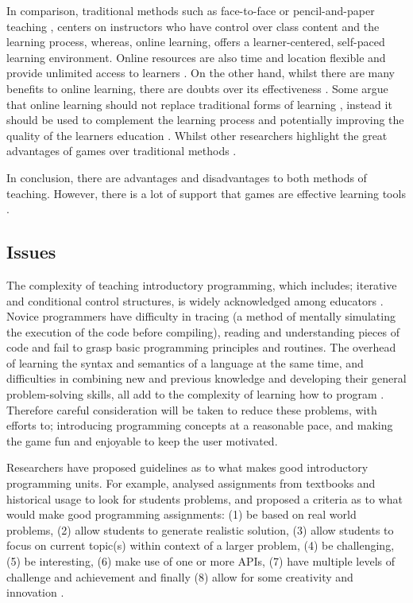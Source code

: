 \documentclass[a4paper,11.5pt]{report}
\numberwithin{figure}{section}
\numberwithin{table}{section}
\numberwithin{equation}{section}
\numberwithin{equation}{section}
\begin{document}
In comparison, traditional methods such as face-to-face or pencil-and-paper teaching \citep{Girard2013}, centers on instructors who have control over class content and the learning process, whereas, online learning, offers a learner-centered, self-paced learning environment. Online resources are also time and location flexible and provide unlimited access to learners \citep{Zhang2004}. On the other hand, whilst there are many benefits to online learning, there are doubts over its effectiveness \citep{Zhang2004}. Some argue that online learning should not replace traditional forms of learning \citep{Zhang2004, Gunasekaran2002, agal2010}, instead it should be used to complement the learning process \citep{Zhang2004} and potentially improving the quality of the learners education \citep{Concannon2005}. Whilst other researchers highlight the great advantages of games over traditional methods \citep{Girard2013}.


In conclusion, there are advantages and disadvantages to both methods of teaching. However, there is a lot of support that games are effective learning tools \citep{Girard2013}.

\subsection{Issues}

The complexity of teaching introductory programming, which includes; iterative and conditional control structures, is widely acknowledged among educators \citep{Koulouri2014}. Novice programmers have difficulty in tracing (a method of mentally simulating the execution of the code before compiling), reading and understanding pieces of code and fail to grasp basic programming principles and routines. The overhead of learning the syntax and semantics of a language at the same time, and difficulties in combining new and previous knowledge and developing their general problem-solving skills, all add to the complexity of learning how to program \citep{Koulouri2014}. Therefore careful consideration will be taken to reduce these problems, with efforts to; introducing programming concepts at a reasonable pace, and making the game fun and enjoyable to keep the user motivated. %

Researchers have proposed guidelines as to what makes good introductory programming units. For example, \citeauthor{Stevenson2006} analysed assignments from textbooks and historical usage to look for students problems, and proposed a criteria as to what would make good programming assignments: (1) be based on real world problems, (2) allow students to generate realistic solution, (3) allow students to focus on current topic(s) within context of a larger problem, (4) be challenging, (5) be interesting, (6) make use of one or more APIs, (7) have multiple levels of challenge and achievement and finally (8) allow for some creativity and innovation \citep{Stevenson2006}.
\end{document}
